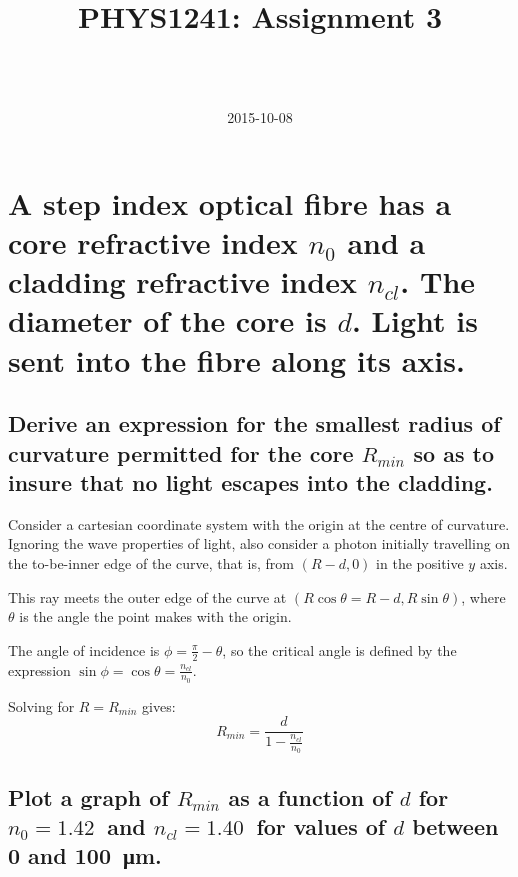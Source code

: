 \documentclass[a4paper]{scrartcl}
\begin{document}
\title{PHYS1241: Assignment 3}
\author{ \\ \\ }
\date{2015-10-08}
\maketitle

\section{A step index optical fibre has a core refractive index \(n_0\) and a cladding refractive index \(n_{cl}\). The diameter of the core is \(d\). Light is sent into the fibre along its axis.}
\subsection{Derive an expression for the smallest radius of curvature permitted for the core \(R_{min}\) so as to insure that no light escapes into the cladding.}
Consider a cartesian coordinate system with the origin at the centre of curvature. Ignoring the wave properties of light, also consider a photon initially travelling on the to-be-inner edge of the curve, that is, from \((R - d, 0)\) in the positive \(y\) axis.

This ray meets the outer edge of the curve at \((R \cos \theta = R - d, R \sin \theta)\), where \(\theta\) is the angle the point makes with the origin.

The angle of incidence is \(\phi = \frac{\pi}{2} - \theta\), so the critical angle is defined by the expression \(\sin \phi = \cos \theta = \frac{n_{cl}}{n_0}\).

Solving for \(R = R_{min}\) gives:
\[R_{min} = \frac{d}{1 - \frac{n_{cl}}{n_0}}\]

\subsection{Plot a graph of \(R_{min}\) as a function of \(d\) for \(n_0 = \SI{1.42}{}\) and \(n_{cl} = \SI{1.40}{}\) for values of \(d\) between \SI{0}{} and \SI{100}{\micro\metre}.}
\begin{center}
\end{center}
\end{document}
